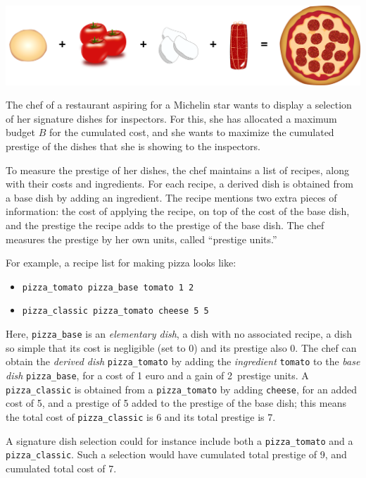
\includegraphics[width=\linewidth]{ingredients}

\noindent The chef of a restaurant aspiring for a Michelin star wants to display a selection of
her signature dishes for inspectors. 
For this, she has allocated a maximum budget $B$ for the cumulated cost, and
she wants
to maximize the cumulated prestige of the dishes that she is showing to the inspectors.

To measure the prestige of her dishes, the chef maintains a list of recipes,
along with their costs and ingredients. For each recipe, a derived dish is
obtained from a base dish by adding an ingredient. The recipe mentions two
extra pieces of information: the cost of applying the recipe, on top of the
cost of the base dish, and the prestige the recipe adds to the prestige
of the base dish.
The chef measures the prestige by her own units, called ``prestige units.''

For example, a recipe list for making pizza looks like:
\begin{itemize}
  \item \texttt{pizza\_tomato	pizza\_base	tomato	1
    2}
  \item \texttt{pizza\_classic	pizza\_tomato	cheese	5	5}
\end{itemize}
Here, \texttt{pizza\_base} is an \emph{elementary dish}, a dish with no
associated recipe, a dish so simple
that its cost is negligible (set to 0) and its prestige also 0.
The chef can obtain the \emph{derived dish}
\texttt{pizza\_tomato} by adding the \emph{ingredient} \texttt{tomato}
to the \emph{base dish} \texttt{pizza\_base}, for a cost of 1 euro and a gain
of 2~prestige units. A
\texttt{pizza\_classic} is obtained from a \texttt{pizza\_tomato} by
adding \texttt{cheese},
for an added cost of 5, and a prestige of 5 added to the prestige of
the base dish; this means the total cost of
\texttt{pizza\_classic} is 6 and its total prestige is 7.

A signature dish selection could for instance include both a
\texttt{pizza\_tomato} and a \texttt{pizza\_classic}. Such a selection
would have cumulated total prestige of 9, and cumulated total cost of 7.

